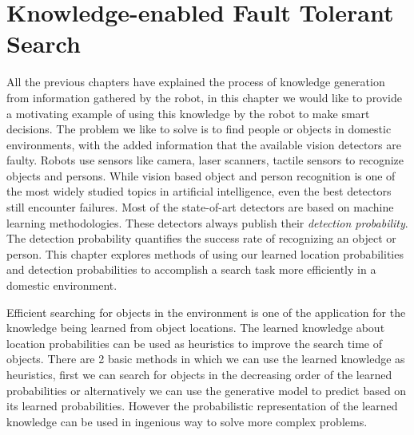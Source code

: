 \chapter{Knowledge-enabled Fault Tolerant Search}
\label{cha: search}

All the previous chapters have explained the process of knowledge generation from information gathered by the robot, in this chapter we would like to provide a motivating example of using this knowledge by the robot to make smart decisions. The problem we like to solve is to find people or objects in domestic environments, with the added information that the available vision detectors are faulty. Robots use sensors like camera, laser scanners, tactile sensors  to recognize objects and persons. While vision based object and person recognition is one of the most widely studied topics in artificial intelligence, even the best detectors still encounter failures. Most of the state-of-art detectors are based on machine learning methodologies. These detectors always publish their \emph{detection probability}. The detection probability quantifies the success rate of recognizing an object or person. This chapter explores methods of using our learned location probabilities and detection probabilities to accomplish a search task more efficiently in a domestic environment. 


Efficient searching for objects in the environment is one of the application for the knowledge being learned from object locations. The learned knowledge about location probabilities can be used as heuristics to improve the search time of objects. There are 2 basic methods in which we can use the learned knowledge as heuristics, first we can search for objects in the decreasing order of the learned probabilities or alternatively we can use the generative model to predict based on its learned probabilities. However the probabilistic representation of the learned knowledge can be used in ingenious way to solve more complex problems. 


